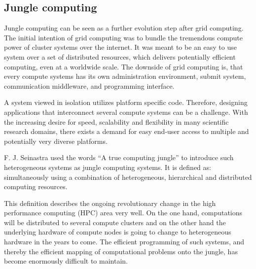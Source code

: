 \subsection{Jungle computing}
\label{sec:jungle}
Jungle computing can be seen as a further evolution step after grid
computing. The initial intention of grid computing was to
bundle the tremendous compute power of cluster systems over the
internet\cite{ref:grid}. It was meant to be an easy to use system over a
set of distributed resources, which delivers potentially efficient
computing, even at a worldwide scale.  The downside of grid computing
is, that every compute systems has its own administration environment,
submit system, communication middleware, and programming interface.

A system viewed in isolation utilizes platform specific
code. Therefore, designing applications that interconnect several
compute systems can be a challenge.  With the increasing desire for
speed, scalability and flexibility in many scientific research
domains, there exists a demand for easy end-user access to multiple
and potentially very diverse platforms.

F. J. Seinastra used the words ``A true computing jungle''
to introduce such heterogeneous systems as jungle computing
systems\cite{ref:jungle}. It is defined as: simultaneously using a
combination of heterogeneous, hierarchical and distributed computing
resources.

This definition describes the ongoing revolutionary change in the high
performance computing (HPC) area very well. On the one hand,
computations will be distributed to several compute clusters and on
the other hand the underlying hardware of compute nodes is going to
change to heterogeneous hardware in the years to come. The efficient
programming of such systems, and thereby the efficient mapping of
computational problems onto the jungle, has become enormously difficult
to maintain.


